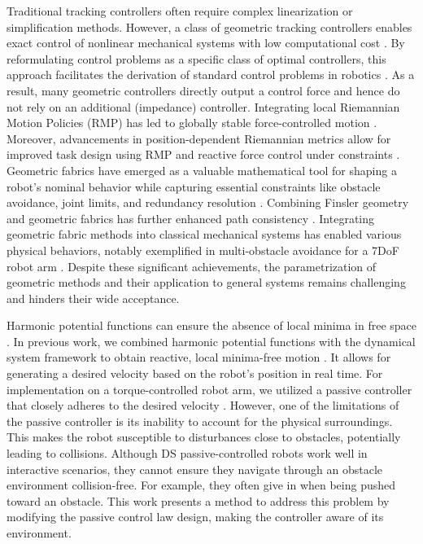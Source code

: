\iflong
Traditional tracking controllers often require complex linearization or simplification methods. However, a class of geometric tracking controllers enables exact control of nonlinear mechanical systems with low computational cost \parencite{udwadia2003new}. By reformulating control problems as a specific class of optimal controllers, this approach facilitates the derivation of standard control problems in robotics \parencite{peters2008unifying}. As a result, many geometric controllers directly output a control force and hence do not rely on an additional (impedance) controller.
Integrating local Riemannian Motion Policies (RMP) has led to globally stable force-controlled motion \parencite{cheng2020rmp}. Moreover, advancements in position-dependent Riemannian metrics allow for improved task design using RMP and reactive force control under constraints \parencite{bylard2021composable}.
Geometric fabrics have emerged as a valuable mathematical tool for shaping a robot's nominal behavior while capturing essential constraints like obstacle avoidance, joint limits, and redundancy resolution \parencite{xie2020geometric}. Combining Finsler geometry and geometric fabrics has further enhanced path consistency \parencite{ratliff2021generalized}.
Integrating geometric fabric methods into classical mechanical systems has enabled various physical behaviors, notably exemplified in multi-obstacle avoidance for a 7DoF robot arm \parencite{van2022geometric}. Despite these significant achievements, the parametrization of geometric methods and their application to general systems remains challenging and hinders their wide acceptance.
\fi

Harmonic potential functions can ensure the absence of local minima in free space \parencite{connolly1997harmonic}. In previous work, we combined harmonic potential functions with the dynamical system framework to obtain reactive, local minima-free motion \parencite{huber2019avoidance, huber2023avoidance}. It allows for generating a desired velocity based on the robot's position in real time.
For implementation on a torque-controlled robot arm, we utilized a passive controller that closely adheres to the desired velocity \parencite{kronander2015passive}. However, one of the limitations of the passive controller is its inability to account for the physical surroundings. This makes the robot susceptible to disturbances close to obstacles, potentially leading to collisions.
Although DS passive-controlled robots work well in interactive scenarios, they cannot ensure they navigate through an obstacle environment collision-free. For example, they often give in when being pushed toward an obstacle. This work presents a method to address this problem by modifying the passive control law design, making the controller aware of its environment.
